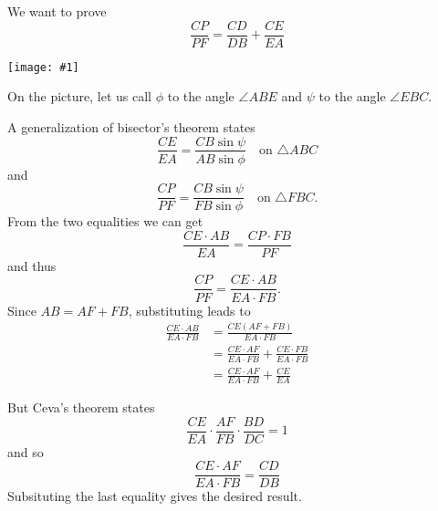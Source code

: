 \documentclass[12pt]{article}
\newcommand{\figura}[1]{\begin{center}\texttt{[image: \#1]}\end{center}}
\begin{document}
We want to prove
\[\frac{CP}{PF} =\frac{CD}{DB} +\frac{CE}{EA}\]
\figura{aubel}

On the picture, let us call $\phi$ to the angle $\angle ABE$ and $\psi$ to the angle $\angle EBC$.

A generalization of bisector's theorem states
\[\frac{CE}{EA} = \frac{CB \sin \psi}{AB\sin\phi} \quad\mbox{on }\triangle ABC\]
and
\[\frac{CP}{PF} = \frac{CB \sin \psi}{FB\sin\phi} \quad\mbox{on }\triangle FBC.
\]
From the two equalities we can get
\[\frac{CE\cdot AB}{EA}=\frac{CP\cdot FB}{PF}\]
and thus
\[\frac{CP}{PF}=\frac{CE\cdot AB}{EA\cdot FB}.\]
Since $AB=AF+FB$, substituting leads to
\begin{align*}
\frac{CE\cdot AB}{EA\cdot FB}&=\frac{CE(AF+FB)}{EA\cdot FB}\\
&=\frac{CE\cdot AF}{EA\cdot FB}+\frac{CE\cdot FB}{EA\cdot FB}\\
&=\frac{CE\cdot AF}{EA\cdot FB}+\frac{CE}{EA}
\end{align*}

But Ceva's theorem states 
\[\frac{CE}{EA}\cdot\frac{AF}{FB}\cdot\frac{BD}{DC}=1\]
and so 
\[\frac{CE\cdot AF}{EA\cdot FB}=\frac{CD}{DB}\]
Subsituting the last equality gives the desired result.
\end{document}
